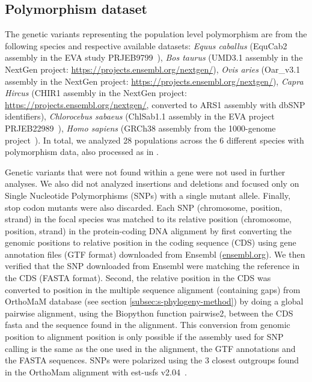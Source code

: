 \documentclass{article}
\begin{document}
    \subsection{Polymorphism dataset}
    \label{subsec:polymorphism-dataset}

    The genetic variants representing the population level polymorphism are from the following species and respective available datasets: \textit{Equus caballus} (EquCab2 assembly in the EVA study PRJEB9799~\cite{alabri_whole_2020}), \textit{Bos taurus} (UMD3.1 assembly in the NextGen project: \url{https://projects.ensembl.org/nextgen/}), \textit{Ovis aries} (Oar\_v3.1 assembly in the NextGen project: \url{https://projects.ensembl.org/nextgen/}), \textit{Capra Hircus} (CHIR1 assembly in the NextGen project: \url{https://projects.ensembl.org/nextgen/}, converted to ARS1 assembly with dbSNP identifiers\cite{sherry_dbsnp_2001}), \textit{Chlorocebus sabaeus} (ChlSab1.1 assembly in the EVA project PRJEB22989~\cite{svardal_ancient_2017}), \textit{Homo sapiens} (GRCh38 assembly from the 1000-genome project~\cite{consortium_integrated_2012a, the1000genomesprojectconsortium_global_2015}).
    In total, we analyzed 28 populations across the 6 different species with polymorphism data, also processed as in \textcite{latrille_genes_2022}.

    Genetic variants that were not found within a gene were not used in further analyses.
    We also did not analyzed insertions and deletions and focused only on Single Nucleotide Polymorphisms (SNPs) with a single mutant allele.
    Finally, stop codon mutants were also discarded.
    Each SNP (chromosome, position, strand) in the focal species was matched to its relative position (chromosome, position, strand) in the protein-coding DNA alignment by first converting the genomic positions to relative position in the coding sequence (CDS) using gene annotation files (GTF format) downloaded from Ensembl (\url{ensembl.org}).
    We then verified that the SNP downloaded from Ensembl were matching the reference in the CDS (FASTA format).
    Second, the relative position in the CDS was converted to position in the multiple sequence alignment (containing gaps) from OrthoMaM database (see section \ref{subsec:s-phylogeny-method}) by doing a global pairwise alignment, using the Biopython function pairwise2, between the CDS fasta and the sequence found in the alignment.
    This conversion from genomic position to alignment position is only possible if the assembly used for SNP calling is the same as the one used in the alignment, the GTF annotations and the FASTA sequences.
    SNPs were polarized using the $3$ closest outgroups found in the OrthoMam alignment with est-usfs v2.04~\cite{keightley_inferring_2018}.
\end{document}
